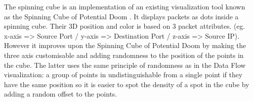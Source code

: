 The spinning cube is an implementation of an existing visualization tool known as the Spinning Cube of Potential Doom \cite{cube04}.
It displays packets as dots inside a spinning cube. Their 3D position and color is based on 3 packet attributes. (eg. x-axis => Source Port / y-axis => Destination Port / z-axis => Source IP). 
However it improves upon the Spinning Cube of Potential Doom by making the three axis customisable and adding randomness to the position of the points in the cube. 
The latter uses the same principle of randomness as in the Data Flow visualization: a group of points in undistinguishable from a single point if they have the same position so it is easier to spot the density of a spot in the cube by adding a random offset to the points.
 


